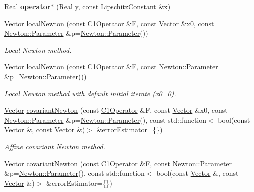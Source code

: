 \begin{DoxyCompactItemize}
\item 
\hypertarget{namespaceSpacy_a27fea9675330259cd5987d51798da16d}{\hyperlink{classSpacy_1_1Real}{\-Real} {\bfseries operator$\ast$} (\hyperlink{classSpacy_1_1Real}{\-Real} y, const \hyperlink{classSpacy_1_1LipschitzConstant}{\-Lipschitz\-Constant} \&x)}\label{namespaceSpacy_a27fea9675330259cd5987d51798da16d}

\item 
\hyperlink{classSpacy_1_1Vector}{\-Vector} \hyperlink{group__NewtonGroup_ga448b8e78b2e84ed78e70c42114ea7599}{local\-Newton} (const \hyperlink{classSpacy_1_1C1Operator}{\-C1\-Operator} \&\-F, const \hyperlink{classSpacy_1_1Vector}{\-Vector} \&x0, const \hyperlink{structSpacy_1_1Newton_1_1Parameter}{\-Newton\-::\-Parameter} \&p=\hyperlink{structSpacy_1_1Newton_1_1Parameter}{\-Newton\-::\-Parameter}())
\begin{DoxyCompactList}\small\item\em \-Local \-Newton method. \end{DoxyCompactList}\item 
\hyperlink{classSpacy_1_1Vector}{\-Vector} \hyperlink{group__NewtonGroup_gafbe5e25f46f7b0d237f5e9971cef998a}{local\-Newton} (const \hyperlink{classSpacy_1_1C1Operator}{\-C1\-Operator} \&\-F, const \hyperlink{structSpacy_1_1Newton_1_1Parameter}{\-Newton\-::\-Parameter} \&p=\hyperlink{structSpacy_1_1Newton_1_1Parameter}{\-Newton\-::\-Parameter}())
\begin{DoxyCompactList}\small\item\em \-Local \-Newton method with default initial iterate (x0=0). \end{DoxyCompactList}\item 
\hyperlink{classSpacy_1_1Vector}{\-Vector} \hyperlink{group__NewtonGroup_ga6c18ad252cb530e4f6734eb4e4fda481}{covariant\-Newton} (const \hyperlink{classSpacy_1_1C1Operator}{\-C1\-Operator} \&\-F, const \hyperlink{classSpacy_1_1Vector}{\-Vector} \&x0, const \hyperlink{structSpacy_1_1Newton_1_1Parameter}{\-Newton\-::\-Parameter} \&p=\hyperlink{structSpacy_1_1Newton_1_1Parameter}{\-Newton\-::\-Parameter}(), const std\-::function$<$ bool(const \hyperlink{classSpacy_1_1Vector}{\-Vector} \&, const \hyperlink{classSpacy_1_1Vector}{\-Vector} \&)$>$ \&error\-Estimator=\{\})
\begin{DoxyCompactList}\small\item\em \-Affine covariant \-Newton method. \end{DoxyCompactList}\item 
\hyperlink{classSpacy_1_1Vector}{\-Vector} \hyperlink{group__NewtonGroup_ga2d469322482680319bf81d865ed57068}{covariant\-Newton} (const \hyperlink{classSpacy_1_1C1Operator}{\-C1\-Operator} \&\-F, const \hyperlink{structSpacy_1_1Newton_1_1Parameter}{\-Newton\-::\-Parameter} \&p=\hyperlink{structSpacy_1_1Newton_1_1Parameter}{\-Newton\-::\-Parameter}(), const std\-::function$<$ bool(const \hyperlink{classSpacy_1_1Vector}{\-Vector} \&, const \hyperlink{classSpacy_1_1Vector}{\-Vector} \&)$>$ \&error\-Estimator=\{\})

\end{DoxyCompactItemize}
